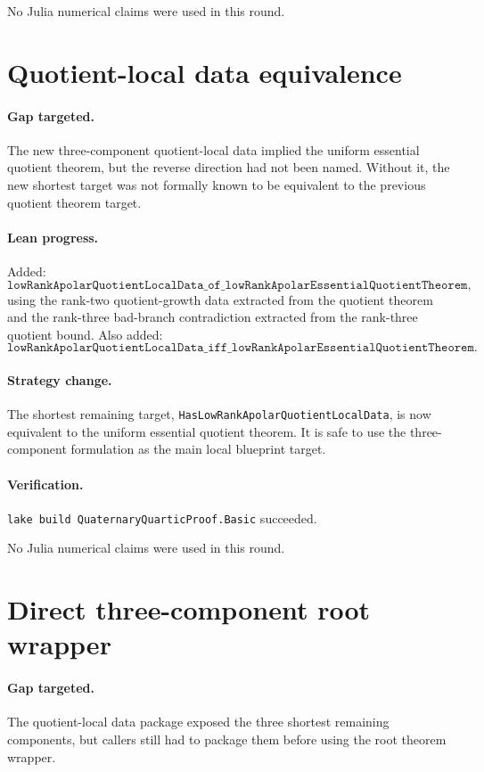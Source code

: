 \documentclass[11pt]{article}
\begin{document}
No Julia numerical claims were used in this round.

\section*{Quotient-local data equivalence}

\paragraph{Gap targeted.}
The new three-component quotient-local data implied the uniform essential
quotient theorem, but the reverse direction had not been named.  Without it,
the new shortest target was not formally known to be equivalent to the
previous quotient theorem target.

\paragraph{Lean progress.}
Added:
\[
\texttt{lowRankApolarQuotientLocalData\_of\_lowRankApolarEssentialQuotientTheorem},
\]
using the rank-two quotient-growth data extracted from the quotient theorem
and the rank-three bad-branch contradiction extracted from the rank-three
quotient bound.  Also added:
\[
\texttt{lowRankApolarQuotientLocalData\_iff\_lowRankApolarEssentialQuotientTheorem}.
\]

\paragraph{Strategy change.}
The shortest remaining target,
\texttt{HasLowRankApolarQuotientLocalData}, is now equivalent to the uniform
essential quotient theorem.  It is safe to use the three-component formulation
as the main local blueprint target.

\paragraph{Verification.}
\texttt{lake build QuaternaryQuarticProof.Basic} succeeded.

No Julia numerical claims were used in this round.

\section*{Direct three-component root wrapper}

\paragraph{Gap targeted.}
The quotient-local data package exposed the three shortest remaining
components, but callers still had to package them before using the root theorem
wrapper.
\end{document}
